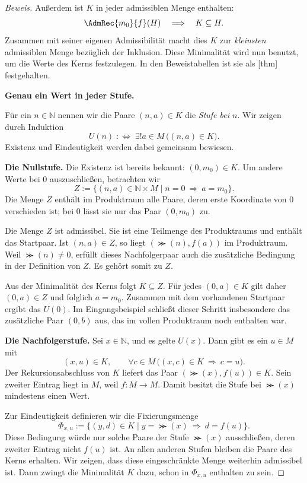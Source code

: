 \begin{proof}[Beweis]
Außerdem ist \(K\) in jeder admissiblen Menge enthalten:
\[
  \AdmRec{m_0}{f}(H)\quad\Longrightarrow\quad K\subseteq H.
\]
Zusammen mit seiner eigenen Admissibilität macht dies \(K\) zur
\emph{kleinsten} admissiblen Menge bezüglich der Inklusion.
Diese Minimalität wird nun benutzt, um die Werte des Kerns
festzulegen. In den Beweistabellen ist sie als
[thm] festgehalten.

\par{}
\medskip\noindent\textbf{Genau ein Wert in jeder Stufe.}

Für ein \(n\in\mathbb N\) nennen wir die Paare \((n,a)\in K\)
die \emph{Stufe bei \(n\)}. Wir zeigen durch Induktion
\[
  U(n)\;:\Longleftrightarrow\;
  \exists!a\in M\,\bigl((n,a)\in K\bigr).
\]
Existenz und Eindeutigkeit werden dabei gemeinsam bewiesen.

\medskip\noindent
\textbf{Die Nullstufe.}
Die Existenz ist bereits bekannt: \((0,m_0)\in K\).
Um andere Werte bei \(0\) auszuschließen, betrachten wir
\[
  Z:=\{(n,a)\in\mathbb N\times M
         \mid n=0\ \Longrightarrow\ a=m_0\}.
\]
Die Menge \(Z\) enthält im Produktraum alle Paare, deren erste
Koordinate von \(0\) verschieden ist; bei \(0\) lässt sie nur
das Paar \((0,m_0)\) zu.

Die Menge \(Z\) ist admissibel. Sie ist eine Teilmenge des
Produktraums und enthält das Startpaar. Ist \((n,a)\in Z\),
so liegt \((\Succ(n),f(a))\) im Produktraum. Weil
\(\Succ(n)\neq0\), erfüllt dieses Nachfolgerpaar auch die
zusätzliche Bedingung in der Definition von \(Z\).
Es gehört somit zu \(Z\).

Aus der Minimalität des Kerns folgt \(K\subseteq Z\).
Für jedes \((0,a)\in K\) gilt daher \((0,a)\in Z\) und
folglich \(a=m_0\). Zusammen mit dem vorhandenen Startpaar
ergibt das \(U(0)\).
Im Eingangsbeispiel schließt dieser Schritt insbesondere das
zusätzliche Paar \((0,b)\) aus, das im vollen Produktraum
noch enthalten war.

\medskip\noindent
\textbf{Die Nachfolgerstufe.}
Sei \(x\in\mathbb N\), und es gelte \(U(x)\).
Dann gibt es ein \(u\in M\) mit
\[
  (x,u)\in K,
  \qquad
  \forall c\in M\,
    \bigl((x,c)\in K\ \Longrightarrow\ c=u\bigr).
\]
Der Rekursionsabschluss von \(K\) liefert das Paar
\((\Succ(x),f(u))\in K\). Sein zweiter Eintrag liegt in
\(M\), weil \(f\colon M\to M\). Damit besitzt die Stufe
bei \(\Succ(x)\) mindestens einen Wert.

Zur Eindeutigkeit definieren wir die Fixierungsmenge
\[
  \Phi_{x,u}
    :=\{(y,d)\in K
          \mid y=\Succ(x)\ \Longrightarrow\ d=f(u)\}.
\]
Diese Bedingung würde nur solche Paare der Stufe \(\Succ(x)\)
ausschließen, deren zweiter Eintrag nicht \(f(u)\) ist.
An allen anderen Stufen bleiben die Paare des Kerns erhalten.
Wir zeigen, dass diese eingeschränkte Menge weiterhin admissibel
ist. Dann zwingt die Minimalität \(K\) dazu, schon in
\(\Phi_{x,u}\) enthalten zu sein.


\end{proof}
